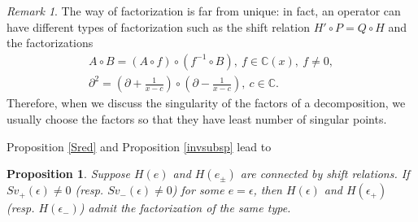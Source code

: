 \documentclass[a4paper,12pt]{article}
\newtheorem{prp}[thm]{Proposition}
\theoremstyle{definition}
\theoremstyle{remark}
\newtheorem{remark}[thm]{Remark}
\numberwithin{equation}{section} %
\begin{document}
\begin{remark} The way of factorization is far from unique: in fact,
an operator can have different types of factorization such as 
the shift relation $H'\circ P=Q\circ H$ and the factorizations
\begin{gather*}
  A\circ B = (A\circ f)\circ (f^{-1}\circ B),\ f\in\mathbb{C}(x),\ f\not=0,\\
  \partial^2=\left(\partial+\frac1{x-c}\right)\circ
  \left(\partial-\frac1{x-c}\right),\ c\in \mathbb{C}.
\end{gather*}
Therefore, when we discuss the singularity of the factors of a decomposition,
we usually choose the factors so that they have least number of singular points.
\end{remark}

\noindent
Proposition \ref{Sred} and Proposition \ref{invsubsp} lead to

\begin{prp}\label{FactorType}
  Suppose $H(e)$ and $H(e_\pm)$ are connected by shift relations. If $Sv_+(\epsilon)\not=0$ (resp. $Sv_-(\epsilon)\not=0$) for some $e=\epsilon$, then $H(\epsilon)$ and $H(\epsilon_+)$ (resp. $H(\epsilon_-)$) admit the factorization of the same type.
\end{prp}
\end{document}
